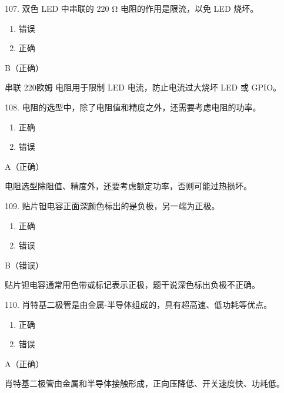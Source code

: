 \begin{question}{107. 双色 LED 中串联的 220 Ω 电阻的作用是限流，以免 LED 烧坏。}
\begin{enumerate}[label=\Alph*., leftmargin=2.4em, itemsep=0.2em]
\item 错误
\item 正确
\end{enumerate}
\end{question}
\begin{answer}
B（正确）
\end{answer}
\begin{explanation}
串联 220欧姆 电阻用于限制 LED 电流，防止电流过大烧坏 LED 或 GPIO。
\end{explanation}

\begin{question}{108. 电阻的选型中，除了电阻值和精度之外，还需要考虑电阻的功率。}
\begin{enumerate}[label=\Alph*., leftmargin=2.4em, itemsep=0.2em]
\item 正确
\item 错误
\end{enumerate}
\end{question}
\begin{answer}
A（正确）
\end{answer}
\begin{explanation}
电阻选型除阻值、精度外，还要考虑额定功率，否则可能过热损坏。
\end{explanation}

\begin{question}{109. 贴片钽电容正面深颜色标出的是负极，另一端为正极。}
\begin{enumerate}[label=\Alph*., leftmargin=2.4em, itemsep=0.2em]
\item 正确
\item 错误
\end{enumerate}
\end{question}
\begin{answer}
B（错误）
\end{answer}
\begin{explanation}
贴片钽电容通常用色带或标记表示正极，题干说深色标出负极不正确。
\end{explanation}

\begin{question}{110. 肖特基二极管是由金属-半导体组成的，具有超高速、低功耗等优点。}
\begin{enumerate}[label=\Alph*., leftmargin=2.4em, itemsep=0.2em]
\item 正确
\item 错误
\end{enumerate}
\end{question}
\begin{answer}
A（正确）
\end{answer}
\begin{explanation}
肖特基二极管由金属和半导体接触形成，正向压降低、开关速度快、功耗低。
\end{explanation}

